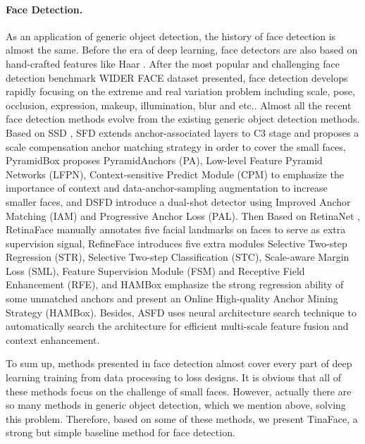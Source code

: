 \documentclass[final]{cvpr}
\begin{document}
\paragraph{Face Detection.}
As an application of generic object detection, the history of face detection is almost the same. Before the era of deep learning, face detectors are also based on hand-crafted features like Haar \cite{viola2001robust}. After the most popular and challenging face detection benchmark WIDER FACE dataset \cite{yang2016wider} presented, face detection develops rapidly focusing on the extreme and real variation problem including scale, pose, occlusion, expression, makeup, illumination, blur and etc.. Almost all the recent face detection methods evolve from the existing generic object detection methods. Based on SSD \cite{liu2016ssd}, SFD \cite{zhang2017s3fd} extends anchor-associated layers to C3 stage and proposes a scale compensation anchor matching strategy in order to cover the small faces, PyramidBox \cite{tang2018pyramidbox} proposes PyramidAnchors (PA), Low-level Feature Pyramid Networks (LFPN), Context-sensitive Predict Module (CPM) to emphasize the importance of context and data-anchor-sampling augmentation to increase smaller faces, and DSFD \cite{Li_2019_CVPR} introduce a dual-shot detector using Improved Anchor Matching (IAM) and Progressive Anchor Loss (PAL). Then Based on RetinaNet \cite{lin2017focal}, RetinaFace \cite{deng2019retinaface} manually annotates five facial landmarks on faces to serve as extra supervision signal, RefineFace \cite{zhang2020refineface} introduces five extra modules Selective Two-step Regression (STR), Selective Two-step Classification (STC), Scale-aware Margin Loss (SML), Feature Supervision Module (FSM) and Receptive Field Enhancement (RFE), and HAMBox \cite{Liu_2020_CVPR} emphasize the strong regression ability of some unmatched anchors and present an Online High-quality Anchor Mining Strategy (HAMBox). Besides, ASFD \cite{zhang2020asfd} uses neural architecture search technique to automatically search the architecture for efficient multi-scale feature fusion and context enhancement.

To sum up, methods presented in face detection almost cover every part of deep learning training from data processing to loss designs. It is obvious that all of these methods focus on the challenge of small faces. However, actually there are so many methods in generic object detection, which we mention above, solving this problem. Therefore, based on some of these methods, we present TinaFace, a strong but simple baseline method for face detection.
\end{document}
